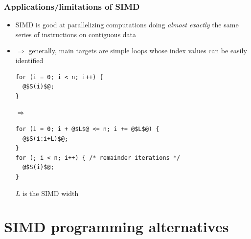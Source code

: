 \documentclass[12pt,dvipdfmx]{beamer}
\newcommand{\ao}[1]{{\color{blue}#1}}
\begin{document}
\begin{frame}[fragile]
\frametitle{Applications/limitations of SIMD}
\begin{itemize}
\item SIMD is good at parallelizing computations
  doing \ao{\em almost exactly} the same series of 
  instructions on contiguous data

\item $\Rightarrow$ generally, main targets are
  simple loops whose index values can be easily identified
\begin{lstlisting}
for (i = 0; i < n; i++) {
  @$S(i)$@;
}
\end{lstlisting}
$\Rightarrow$
\begin{lstlisting}
for (i = 0; i + @$L$@ <= n; i += @$L$@) {
  @$S(i:i+L)$@;
}
for (; i < n; i++) { /* remainder iterations */
  @$S(i)$@;
}
\end{lstlisting}
$L$ is the SIMD width

\end{itemize}
\end{frame}

\section{SIMD programming alternatives}
\end{document}
